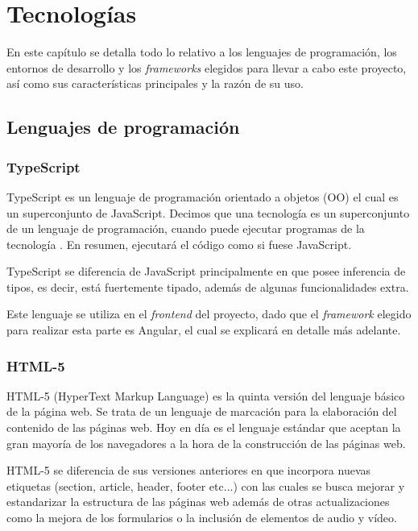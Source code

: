 \chapter{Tecnologías}
 En este capítulo se detalla todo lo relativo a los lenguajes de programación, los entornos de desarrollo y los \textit{frameworks} elegidos para llevar a cabo este proyecto, así como sus características principales y la razón de su uso.
    
    \section{Lenguajes de programación}
    
    \subsection{TypeScript}
    TypeScript\cite{typescript} es un lenguaje de programación orientado a objetos (OO) el cual es un superconjunto de JavaScript. Decimos que una tecnología es un superconjunto de un lenguaje de programación, cuando puede ejecutar programas de la tecnología . En resumen, ejecutará el código como si fuese JavaScript. \newline
        
    TypeScript se diferencia de JavaScript principalmente en que posee inferencia de tipos, es decir, está fuertemente tipado, además de algunas funcionalidades extra.
    \newline
        
    Este lenguaje se utiliza en el \textit{frontend} del proyecto, dado que el \textit{framework} elegido para realizar esta parte es Angular, el cual se explicará en detalle más adelante.
        
    \subsection{HTML-5}
    HTML-5\cite{html} (HyperText Markup Language) es la quinta versión del lenguaje básico de la página web. Se trata de un lenguaje de marcación para la elaboración del contenido de las páginas web.
    Hoy en día es el lenguaje estándar que aceptan la gran mayoría de los navegadores a la hora de la construcción de las páginas web.
    \newline
     
    HTML-5 se diferencia de sus versiones anteriores en que incorpora nuevas etiquetas (section, article, header, footer etc...) con las cuales se busca mejorar y estandarizar la estructura de las páginas web además de otras actualizaciones como la mejora de los formularios o la inclusión de elementos de audio y vídeo.
    \newline
    
